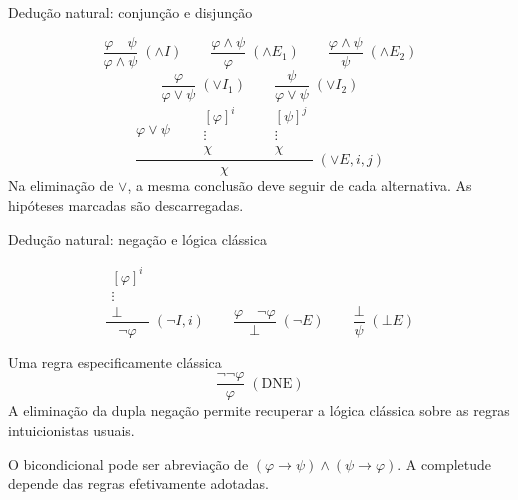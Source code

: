 \documentclass[10pt,aspectratio=169]{beamer}
\newcommand{\dest}[1]{\alert{#1}}
\begin{document}
\begin{frame}{Dedução natural: conjunção e disjunção}

\[\frac{\varphi\quad\psi}{\varphi\land\psi}\;(\land I)
\qquad\frac{\varphi\land\psi}{\varphi}\;(\land E_1)
\qquad\frac{\varphi\land\psi}{\psi}\;(\land E_2)\]
\[\frac{\varphi}{\varphi\lor\psi}\;(\lor I_1)
\qquad\frac{\psi}{\varphi\lor\psi}\;(\lor I_2)\]
\[\frac{\varphi\lor\psi\qquad
\begin{array}{c}[\varphi]^i\\\vdots\\\chi\end{array}\qquad
\begin{array}{c}[\psi]^j\\\vdots\\\chi\end{array}}
{\chi}\;(\lor E,i,j)\]
Na eliminação de $\lor$, a mesma conclusão deve seguir de \dest{cada alternativa}. As hipóteses marcadas são descarregadas.
\end{frame}

\begin{frame}{Dedução natural: negação e lógica clássica}

\[\frac{\begin{array}{c}[\varphi]^i\\\vdots\\\bot\end{array}}{\neg\varphi}\;(\neg I,i)
\qquad\frac{\varphi\quad\neg\varphi}{\bot}\;(\neg E)
\qquad\frac{\bot}{\psi}\;(\bot E)\]
\begin{block}{Uma regra especificamente clássica}
\[\frac{\neg\neg\varphi}{\varphi}\;(\mathrm{DNE})\]
A eliminação da dupla negação permite recuperar a lógica clássica sobre as regras intuicionistas usuais.
\end{block}
O bicondicional pode ser abreviação de $(\varphi\to\psi)\land(\psi\to\varphi)$. A completude depende das regras efetivamente adotadas.
\end{frame}
\end{document}
